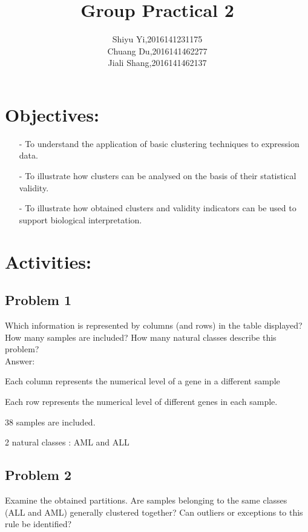 \documentclass[a4pper,11pt,onecolumn]{article}
\title{Group Practical 2 }
\author[*]{Shiyu Yi,2016141231175\\Chuang Du,2016141462277\\Jiali Shang,2016141462137}
\begin{document}
\maketitle

\section{Objectives:}


\begin{itemize}
	
	\item[-] To understand the application of basic clustering techniques to expression data.
	
	\item[-] To illustrate how clusters can be analysed on the basis of their statistical validity.
	
	\item[-] To illustrate how obtained clusters and validity indicators can be used to support
	biological interpretation.
\end{itemize}

\section{Activities:}

\subsection{Problem 1}

Which information is represented by columns (and rows) in the table displayed? How many samples are included? How many natural classes describe this problem?\\

Answer:

Each column represents the numerical level of a gene in a different sample

Each row represents the numerical level of different genes in each sample.

38 samples are included.

2 natural classes : AML and ALL

\subsection{Problem 2}

Examine the obtained partitions. Are samples belonging to the same classes (ALL and AML) generally clustered together? Can outliers or exceptions to this rule be identified?\\
\end{document}
